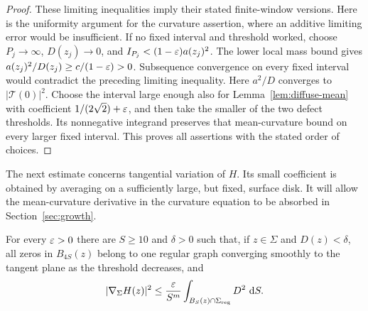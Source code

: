\begin{proof}
These limiting inequalities imply their stated finite-window versions.
Here is the uniformity argument for the curvature assertion, where an
additive limiting error would be insufficient.  If no fixed interval
and threshold worked, choose $P_j\to\infty$, $D(z_j)\to0$, and
$I_{P_j}<(1-\varepsilon)a(z_j)^2$.  The lower local mass bound gives
$a(z_j)^2/D(z_j)\ge c/(1-\varepsilon)>0$.  Subsequence convergence on every
fixed interval would contradict the preceding limiting inequality.
Here $a^2/D$ converges to $|\mathcal T(0)|^2$.
Choose the interval large enough also for Lemma~\ref{lem:diffuse-mean}
with coefficient $1/(2\sqrt2)+\varepsilon$, and then take the smaller of the
two defect thresholds.  Its nonnegative integrand preserves that
mean-curvature bound on every larger fixed interval.  This proves
all assertions with the stated order of choices.
\end{proof}

The next estimate concerns tangential variation of $H$.  Its small
coefficient is obtained by averaging on a sufficiently large, but fixed,
surface disk.  It will allow the mean-curvature derivative in the
curvature equation to be absorbed in Section~\ref{sec:growth}.

\begin{lemma}\label{lem:interface-mean-gradient}
For every $\varepsilon>0$ there are $S\ge10$ and $\delta>0$ such that, if
$z\in\Sigma$ and $D(z)<\delta$, all zeros in $B_{4S}(z)$ belong to
one regular graph converging smoothly to the tangent plane as the
threshold decreases, and
\begin{equation}\label{eq:L2}
 |\nabla_\Sigma H(z)|^2\le
 \frac{\varepsilon}{S^m}\int_{B_S(z)\cap\Sigma_{\rm reg}}D^2\,\,\mathrm d S.
\end{equation}
\end{lemma}

